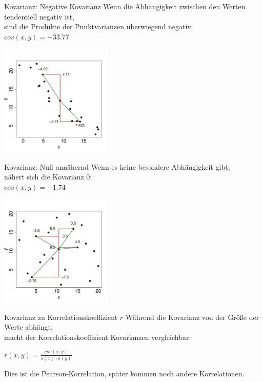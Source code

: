 \begin{frame}
  {Kovarianz: Negative Kovarianz}
  Wenn die Abhängigkeit zwischen den Werten tendentiell negativ ist,\\
  sind die Produkte der Punktvarianzen überwiegend negativ.\\
  $cov(x,y)=-33.77$
  \begin{center}
    \includegraphics[width=0.4\textwidth]{graphics/cov08}
  \end{center}
\end{frame}

\begin{frame}
  {Kovarianz: Null annähernd}
  Wenn es keine besondere Abhängigkeit gibt,\\
  nähert sich die Kovarianz 0:\\
  $cov(x,y)=-1.74$\\
  \vspace{-1cm}
  \begin{center}
    \includegraphics[width=0.4\textwidth]{graphics/cov09}
  \end{center}
\end{frame}

\begin{frame}
  {Kovarianz zu Korrelationskoeffizient $r$}
  Während die Kovarianz \alert{von der Größe der Werte} abhängt,\\
  macht der Korrelationskoeffizient Kovarianzen vergleichbar:\\[3ex]

  \begin{center}
    $r(x,y)=\frac{cov(x,y)}{s(x)\cdot s(y)}$
  \end{center}
  \vspace{0.5cm}
  \pause
  Dies ist die \alert{Pearson-Korrelation}, später kommen noch andere Korrelationen.
\end{frame}


